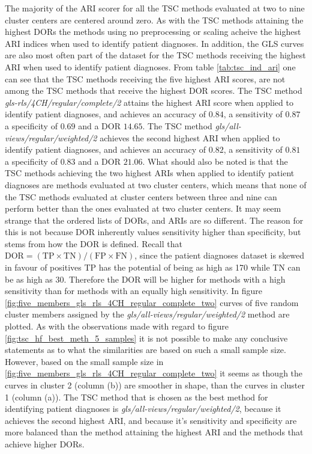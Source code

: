 The majority of the ARI scorer for all the TSC methods evaluated at two to nine cluster centers are centered around zero.
As with the TSC methods attaining the highest DORs the methods using no preprocessing or scaling acheive the highest ARI indices when used to identify patient diagnoses.
In addition, the GLS curves are also most often part of the dataset for the TSC methods receiving the highest ARI when used to identify patient diagnoses.
From table \ref{tab:tsc_ind_ari} one can see that the TSC methods receiving the five highest ARI scores, are not among the TSC methods that receive the highest DOR scores. 
The TSC method \textit{gls-rls/4CH/regular/complete/2} attains the highest ARI score when applied to identify patient diagnoses, and achieves an 
accuracy of $0.84$, a sensitivity of $0.87$ a specificity of $0.69$ and a DOR $14.65$. 
The TSC method \textit{gls/all-views/regular/weighted/2} achieves the second highest ARI when applied to identify patient diagnoses, and achieves an
accuracy of $0.82$, a sensitivity of $0.81$ a specificity of $0.83$ and a DOR $21.06$. 
What should also be noted is that the TSC methods achieving the two highest ARIs when applied to identify patient diagnoses are methods evaluated at two cluster centers,
which means that none of the TSC methods evaluated at cluster centers between three and nine can perform better than the ones evaluated at two cluster centers.
It may seem strange that the ordered lists of DORs, and ARIs are so different. 
The reason for this is not because DOR inherently values sensitivity higher than specificity, but stems from how the DOR is defined. 
Recall that $\mathrm{DOR = ( TP \times TN )/ (FP \times FN)}$, since the patient diagnoses dataset is skewed in favour of positives TP has the potential of being as high as 170 
while TN can be as high as 30. 
Therefore the DOR will be higher for methods with a high sensitivity than for methods with an equally high sensitivity.
In figure \ref{fig:five_members_gls_rls_4CH_regular_complete_two} curves of five random cluster members assigned by the \textit{gls/all-views/regular/weighted/2} method are plotted.
As with the observations made with regard to figure \ref{fig:tsc_hf_best_meth_5_samples} it is not possible to make any conclusive statements as to what the similarities are
based on such a small sample size.
However, based on the small sample size in \ref{fig:five_members_gls_rls_4CH_regular_complete_two} it seems as though the curves in cluster 2 (column (b)) are smoother in shape,
than the curves in cluster 1 (column (a)).
The TSC method that is chosen as the best method for identifying patient diagnoses is \textit{gls/all-views/regular/weighted/2}, because it achieves the second highest ARI, and
because it's sensitivity and specificity are more balanced than the method attaining the highest ARI and the methods that achieve higher DORs.

